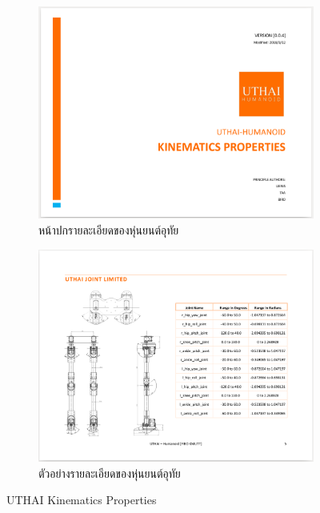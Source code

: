 \begin{figure}[!ht]
    \centering
    \begin{subfigure}[b]{0.45\textwidth}
        \centering
        \includegraphics[width=\textwidth]{chapter4/images/uthai_manual/uthai_kinematics.png}
        \caption{หน้าปกรายละเอียดของหุ่นยนต์อุทัย}
    \end{subfigure}
    \hfill
    \begin{subfigure}[b]{0.45\textwidth}
        \centering
        \includegraphics[width=\textwidth]{chapter4/images/uthai_manual/uthai_kinematics2.png}
        \caption{ตัวอย่างรายละเอียดของหุ่นยนต์อุทัย}
    \end{subfigure}
    \caption{UTHAI Kinematics Properties}
	\label{fig:uthai_kinematics_manual}
\end{figure}
